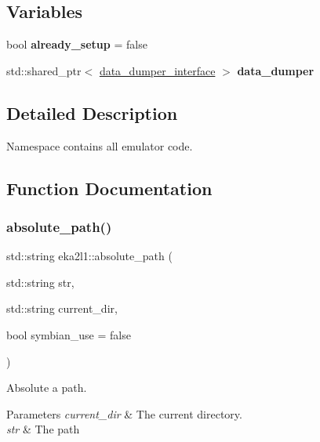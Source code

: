 \subsection*{Variables}
\begin{DoxyCompactItemize}
\item 
\mbox{\label{namespaceeka2l1_ae26ed17413a394e576572d02f881a13e}} 
bool {\bfseries already\+\_\+setup} = false
\item 
\mbox{\label{namespaceeka2l1_a0bc5227a177c67bd792cf14c9ec488a7}} 
std\+::shared\+\_\+ptr$<$ \mbox{\hyperlink{structeka2l1_1_1data__dumper__interface}{data\+\_\+dumper\+\_\+interface}} $>$ {\bfseries data\+\_\+dumper}
\end{DoxyCompactItemize}


\subsection{Detailed Description}
Namespace contains all emulator code. 

\subsection{Function Documentation}
\mbox{\label{namespaceeka2l1_a5b443b59e52b5bc1e3038a2b77db90d3}} 
\subsubsection{\texorpdfstring{absolute\+\_\+path()}{absolute\_path()}}
{\footnotesize\ttfamily std\+::string eka2l1\+::absolute\+\_\+path (\begin{DoxyParamCaption}\item[{std\+::string}]{str,  }\item[{std\+::string}]{current\+\_\+dir,  }\item[{bool}]{symbian\+\_\+use = {\ttfamily false} }\end{DoxyParamCaption})}



Absolute a path. 


\begin{DoxyParams}{Parameters}
{\em current\+\_\+dir} & The current directory. \\
\hline
{\em str} & The path \\
\hline
\end{DoxyParams}
\mbox{\label{namespaceeka2l1_a447fec37657cd384bc6a7782b898731d}} 
